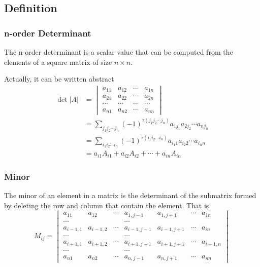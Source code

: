 \documentclass{article}
\theoremstyle{definition}
\begin{document}
\subsection{Definition}
\subsubsection{n-order Determinant}
The n-order determinant is a scalar value that can be computed from 
the elements of a square matrix of size $n\times n$.

Actually, it can be written abstract
\begin{align*}
\det |A|  
& =
\begin{vmatrix}
    a_{11} & a_{12} & \cdots & a_{1n}\\
    a_{21} & a_{22} & \cdots & a_{2n}\\
    \cdots & \cdots & \cdots & \cdots\\
    a_{n1} & a_{n2} & \cdots & a_{nn}
\end{vmatrix} \\
& = \sum_{j_{1}j_{2}\cdots j_{n}}(-1)^{\tau (j_{1}j_{2}\cdots j_{n})} a_{1j_{1}}a_{2j_{2}}\cdots a_{nj_{n}} \\
& = \sum_{i_{1}i_{2}\cdots i_{n}}(-1)^{\tau (i_{1}i_{2}\cdots i_{n})} a_{i_{1}1}a_{i_{2}2}\cdots a_{i_{n}n} \\
& = a_{i1}A_{i1}+a_{i2}A_{i2}+\cdots+a_{in}A_{in}
\end{align*}

\subsubsection{Minor}
The minor of an element in a matrix is the determinant 
of the submatrix formed by deleting the 
row and column that contain the element.
That is 
$$M_{ij}=
\begin{vmatrix}
    a_{11} & a_{12} & \cdots & a_{1,j-1} & a_{1,j+1} & \cdots & a_{1n}\\
    \cdots &  &  & \cdots\\
    a_{i-1,1} & a_{i-1,2} & \cdots & a_{i-1,j-1} & a_{i-1,j+1} & \cdots & a_{in}\\
    \cdots &  &  & \cdots\\
    a_{i+1,1} & a_{i+1,2} & \cdots & a_{i+1,j-1} & a_{i+1,j+1} & \cdots & a_{i+1,n}\\
    \cdots &  &  & \cdots\\
    a_{n1} & a_{n2} & \cdots & a_{n,j-1} & a_{n,j+1} & \cdots & a_{nn}
\end{vmatrix}$$
\end{document}
